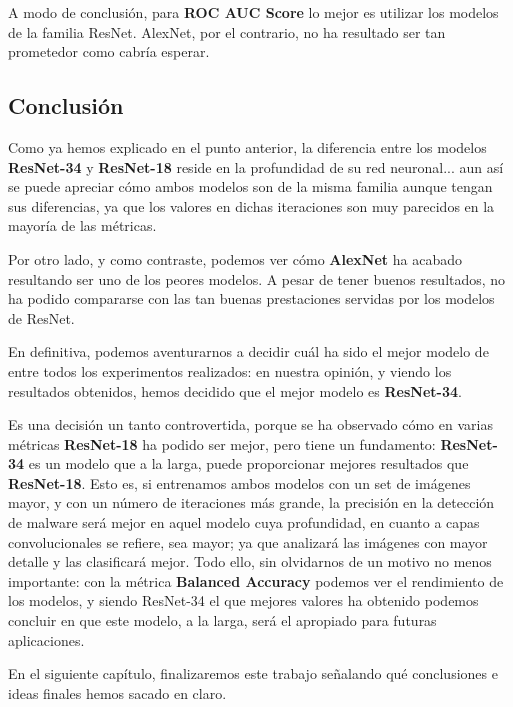 A modo de conclusión, para \textbf{ROC AUC Score} lo mejor es utilizar los modelos de la familia ResNet. AlexNet, por el contrario, no ha resultado ser tan prometedor como cabría esperar.

\subsection{Conclusión}

Como ya hemos explicado en el punto anterior, la diferencia entre los modelos \textbf{ResNet-34} y \textbf{ResNet-18} reside en la profundidad de su red neuronal... aun así se puede apreciar cómo ambos modelos son de la misma familia aunque tengan sus diferencias, ya que los valores en dichas iteraciones son muy parecidos en la mayoría de las métricas.

Por otro lado, y como contraste, podemos ver cómo \textbf{AlexNet} ha acabado resultando ser uno de los peores modelos. A pesar de tener buenos resultados, no ha podido compararse con las tan buenas prestaciones servidas por los modelos de ResNet.

En definitiva, podemos aventurarnos a decidir cuál ha sido el mejor modelo de entre todos los experimentos realizados: en nuestra opinión, y viendo los resultados obtenidos, hemos decidido que el mejor modelo es \textbf{ResNet-34}.

Es una decisión un tanto controvertida, porque se ha observado cómo en varias métricas \textbf{ResNet-18} ha podido ser mejor, pero tiene un fundamento: \textbf{ResNet-34} es un modelo que a la larga, puede proporcionar mejores resultados que \textbf{ResNet-18}. Esto es, si entrenamos ambos modelos con un set de imágenes mayor, y con un número de iteraciones más grande, la precisión en la detección de malware será mejor en aquel modelo cuya profundidad, en cuanto a capas convolucionales se refiere, sea mayor; ya que analizará las imágenes con mayor detalle y las clasificará mejor. Todo ello, sin olvidarnos de un motivo no menos importante: con la métrica \textbf{Balanced Accuracy} podemos ver el rendimiento de los modelos, y siendo ResNet-34 el que mejores valores ha obtenido podemos concluir en que este modelo, a la larga, será el apropiado para futuras aplicaciones.

En el siguiente capítulo, finalizaremos este trabajo señalando qué conclusiones e ideas finales hemos sacado en claro.
